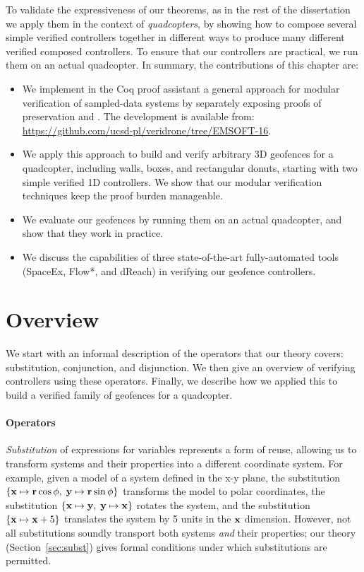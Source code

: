 To validate the expressiveness of our theorems, as in the rest of the
dissertation we apply them in the context of \emph{quadcopters}, by showing
how to compose several simple verified controllers together in different
ways to produce many different verified composed controllers.  To ensure
that our controllers are practical, we run them on an actual quadcopter.
In summary, the contributions of this chapter are:
\begin{itemize}
\setlength\itemsep{0.01em}
\item We implement in the Coq proof assistant a general approach for modular verification of sampled-data systems by separately exposing proofs of preservation and \progress{}. The development is available from: \url{https://github.com/ucsd-pl/veridrone/tree/EMSOFT-16}.
\item We apply this approach to build and verify arbitrary 3D geofences for a quadcopter, including walls, boxes, and rectangular donuts, starting with two simple verified 1D controllers.
We show that our modular verification techniques keep the proof burden manageable.
\item We evaluate our geofences by running them on an actual quadcopter, and show that they work in practice.
\item We discuss the capabilities of three state-of-the-art fully-automated tools (SpaceEx, Flow*, and dReach) in verifying our geofence controllers.
\end{itemize}

\section{Overview}
We start with an informal description of the operators that our theory
covers: substitution, conjunction, and disjunction.  We then give an
overview of verifying controllers using these operators.  Finally, we
describe how we applied this to build a verified family of geofences for a
quadcopter.

\paragraph*{Operators}
\emph{Substitution} of expressions for variables represents a form of
reuse, allowing us to transform systems and their properties into a
different coordinate system.  For example, given a model of a system
defined in the x-y plane, the substitution $\{\mathbf{x} \mapsto \mathbf{r}
\cos \mathbf{\phi},\; \mathbf{y} \mapsto \mathbf{r} \sin \mathbf{\phi}\}$
transforms the model to polar coordinates, the substitution $\{\mathbf{x}
\mapsto \mathbf{y},\; \mathbf{y} \mapsto \mathbf{x}\}$ rotates the system,
and the substitution $\{\mathbf{x} \mapsto \mathbf{x} + 5\}$ translates the
system by 5 units in the $\mathbf{x}$ dimension.  However, not all
substitutions soundly transport both systems \emph{and} their properties;
our theory (Section~\ref{sec:subst}) gives formal conditions under which
substitutions are permitted.

